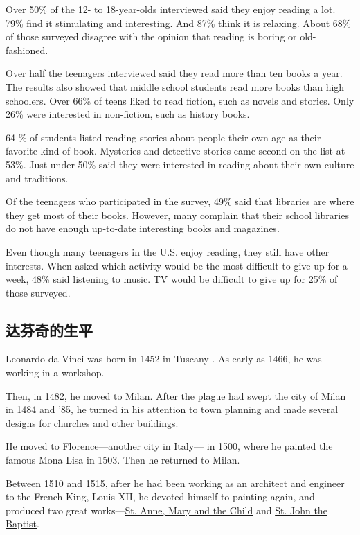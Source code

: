 Over 50\% of the 12- to 18-year-olds interviewed said they
enjoy reading a lot. 79\% find it
stimulating and interesting. And 87\% think it is relaxing.
About 68\% of those surveyed disagree with the opinion
that reading is boring or old-fashioned.

Over half the teenagers interviewed said they read more
than ten books a year. The results also showed that middle
school students read more books than high schoolers. Over 66\% of teens liked to read fiction, such as novels and
stories. Only 26\% were interested in non-fiction, such as
history books.

64 \% of students listed reading stories about
people their own age as their favorite kind of book. Mysteries
and detective stories came second on the list at 53\%.
Just under 50\% said they were interested in reading about
their own culture and traditions.

Of the teenagers who participated in the survey, 49\%
said that libraries are where they get most of their books.
However, many complain that their school libraries do not
have enough up-to-date interesting books and magazines.

Even though many teenagers in the U.S. enjoy reading,
they still have other interests. When asked which activity
would be the most difficult to give up for a week, 48\%
said listening to music. TV would be difficult to give up for
25\% of those surveyed.
\subsection{达芬奇的生平}
Leonardo da Vinci was born in 1452 in Tuscany . As early as
1466, he was working in a workshop.

Then, in 1482, he moved to Milan. After the plague
had swept the city of Milan in 1484 and '85, he turned in
his attention to town planning and made several designs
for churches and other buildings.

He moved to Florence—another city in Italy—
in 1500, where he painted the famous Mona Lisa in 1503.
Then he returned to Milan.

Between 1510 and 1515, after he had been working
as an architect and engineer to the French King, Louis
XII, he devoted himself to painting again, and 
produced two great works—\ul{St. Anne, Mary and the Child} and \ul{St. John the Baptist}.

